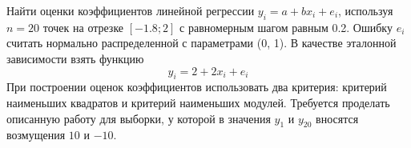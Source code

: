 {Найти оценки коэффициентов линейной регрессии $y_i = a + bx_i + e_i$, используя $n = 20$ точек на отрезке $[-1.8; 2]$ с равномерным шагом равным 0.2. Ошибку $e_i$ считать нормально распределенной с параметрами (0, 1). В качестве эталонной зависимости взять функцию
\begin{equation}
    \label{eq_6:1}
    y_i = 2 + 2x_i + e_i 
\end{equation}
\indent При построении оценок коэффициентов использовать два критерия: критерий наименьших квадратов и критерий наименьших модулей. Требуется проделать описанную работу для выборки, у которой в значения $y_1$ и $y_{20}$ вносятся возмущения $10$ и $-10$.}